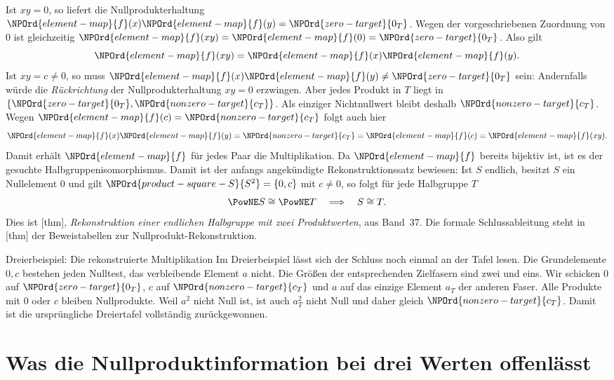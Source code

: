 Ist \(xy=0\), so liefert die Nullprodukterhaltung
\(\NPOrd{element-map}{f}(x)\NPOrd{element-map}{f}(y)=\NPOrd{zero-target}{0_T}\). Wegen der vorgeschriebenen Zuordnung von \(0\)
ist gleichzeitig \(\NPOrd{element-map}{f}(xy)=\NPOrd{element-map}{f}(0)=\NPOrd{zero-target}{0_T}\). Also gilt
\[
 \NPOrd{element-map}{f}(xy)=\NPOrd{element-map}{f}(x)\NPOrd{element-map}{f}(y).
\]
Ist \(xy=c\ne0\), so muss \(\NPOrd{element-map}{f}(x)\NPOrd{element-map}{f}(y)\ne\NPOrd{zero-target}{0_T}\) sein: Andernfalls
würde die \emph{Rückrichtung} der Nullprodukterhaltung \(xy=0\)
erzwingen. Aber jedes Produkt in \(T\) liegt in \(\{\NPOrd{zero-target}{0_T},\NPOrd{nonzero-target}{c_T}\}\).
Als einziger Nichtnullwert bleibt deshalb \(\NPOrd{nonzero-target}{c_T}\).
Wegen \(\NPOrd{element-map}{f}(c)=\NPOrd{nonzero-target}{c_T}\) folgt auch hier
\[
 \NPOrd{element-map}{f}(x)\NPOrd{element-map}{f}(y)=\NPOrd{nonzero-target}{c_T}=\NPOrd{element-map}{f}(c)=\NPOrd{element-map}{f}(xy).
\]
Damit erhält \(\NPOrd{element-map}{f}\) für jedes Paar die Multiplikation.
Da \(\NPOrd{element-map}{f}\) bereits bijektiv ist, ist es der gesuchte Halbgruppenisomorphismus.
Damit ist der anfangs angekündigte Rekonstruktionssatz bewiesen:
Ist \(S\) endlich, besitzt \(S\) ein Nullelement \(0\) und gilt
\(\NPOrd{product-square-S}{S^2}=\{0,c\}\) mit \(c\ne0\), so folgt für jede Halbgruppe \(T\)
\[
 \PowNE S\cong\PowNE T\quad\Longrightarrow\quad S\cong T.
\]
Dies ist [thm],
\emph{Rekonstruktion einer endlichen Halbgruppe mit zwei Produktwerten},
aus Band~37. Die formale Schlussableitung steht in
[thm] der Beweistabellen
zur Nullprodukt-Rekonstruktion.

\begin{NPReadingExample}{Dreierbeispiel: Die rekonstruierte Multiplikation}
Im Dreierbeispiel lässt sich der Schluss noch einmal an der Tafel lesen.
Die Grundelemente \(0,c\) bestehen jeden Nulltest, das verbleibende
Element \(a\) nicht. Die Größen der entsprechenden Zielfasern sind
zwei und eins. Wir schicken \(0\) auf \(\NPOrd{zero-target}{0_T}\), \(c\) auf \(\NPOrd{nonzero-target}{c_T}\)
und \(a\) auf das einzige Element \(a_T\) der anderen Faser.
Alle Produkte mit \(0\) oder \(c\) bleiben Nullprodukte.
Weil \(a^2\) nicht Null ist, ist auch \(a_T^2\) nicht Null und
daher gleich \(\NPOrd{nonzero-target}{c_T}\). Damit ist die ursprüngliche Dreiertafel
vollständig zurückgewonnen.
\end{NPReadingExample}

\section*{Was die Nullproduktinformation bei drei Werten offenlässt}

